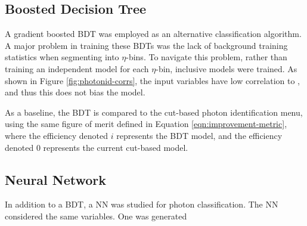 \subsection{Boosted Decision Tree}

A gradient boosted \gls{BDT} was employed as an alternative classification algorithm. A major problem in training these \glspl{BDT} was the lack of background training statistics when segmenting into $\eta$-\pt bins. To navigate this problem, rather than training an independent model for each $\eta$-\pt bin, \pt inclusive models were trained. As shown in Figure \ref{fig:photonid-corrs}, the input variables have low correlation to \pt, and thus this does not bias the model.


As a baseline, the \gls{BDT} is compared to the cut-based photon identification menu, using the same figure of merit defined in Equation \ref{eqn:improvement-metric}, where the efficiency denoted $i$ represents the \gls{BDT} model, and the efficiency denoted $0$ represents the current cut-based model.


\subsection{Neural Network}

In addition to a \gls{BDT}, a \gls{NN} was studied for photon classification. The \gls{NN} considered the same variables. One was generated 